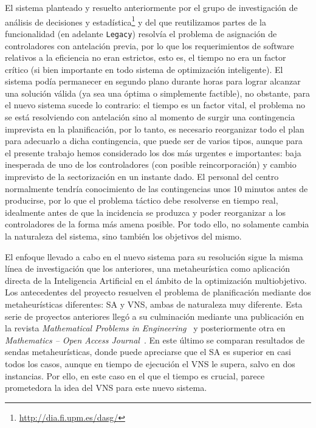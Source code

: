 El sistema planteado y resuelto anteriormente por el grupo de investigación de análisis de decisiones y estadística\footnote{\url{http://dia.fi.upm.es/dasg/}} y del que reutilizamos partes de la funcionalidad (en adelante \texttt{Legacy}) resolvía el problema de asignación de controladores con antelación previa, por lo que los requerimientos de software relativos a la eficiencia no eran estrictos, esto es, el tiempo no era un factor crítico (si bien importante en todo sistema de optimización inteligente). El sistema podía permanecer en segundo plano durante horas para lograr alcanzar una solución válida (ya sea una óptima o simplemente factible), no obstante, para el nuevo sistema sucede lo contrario: 
el tiempo es un factor vital, el problema no se está resolviendo con antelación sino al momento de surgir una contingencia imprevista en la planificación, por lo tanto, es necesario reorganizar todo el plan para adecuarlo a dicha contingencia, que puede ser de varios tipos, aunque para el presente trabajo hemos considerado los dos más urgentes e importantes: baja inesperada de uno de los controladores (con posible reincorporación) y cambio imprevisto de la sectorización en un instante dado. 
El personal del centro normalmente tendría conocimiento de las contingencias unos 10 minutos antes de producirse, por lo que el problema táctico debe resolverse en tiempo real, idealmente antes de que la incidencia se produzca y poder reorganizar a los controladores de la forma más amena posible.
Por todo ello, no solamente cambia la naturaleza del sistema, sino también los objetivos del mismo.

El enfoque llevado a cabo en el nuevo sistema para su resolución sigue la misma línea de investigación que los anteriores, una metaheurística como aplicación directa de la Inteligencia Artificial en el ámbito de la optimización multiobjetivo.
Los antecedentes del proyecto resuelven el problema de planificación mediante dos metaheurísticas diferentes: \gls{SA} y \gls{VNS}, ambas de naturaleza muy diferente. 
Esta serie de proyectos anteriores llegó a su culminación mediante una publicación en la revista \textit{Mathematical Problems in Engineering}~\cite{articulo1} y posteriormente otra en \textit{Mathematics -- Open Access Journal}~\cite{articulo2}. 
En este último se comparan resultados de sendas metaheurísticas, donde puede apreciarse que el SA es superior en casi todos los casos, aunque en tiempo de ejecución el VNS le supera, salvo en dos instancias. Por ello, en este caso en el que el tiempo es crucial, parece prometedora la idea del VNS para este nuevo sistema. 

